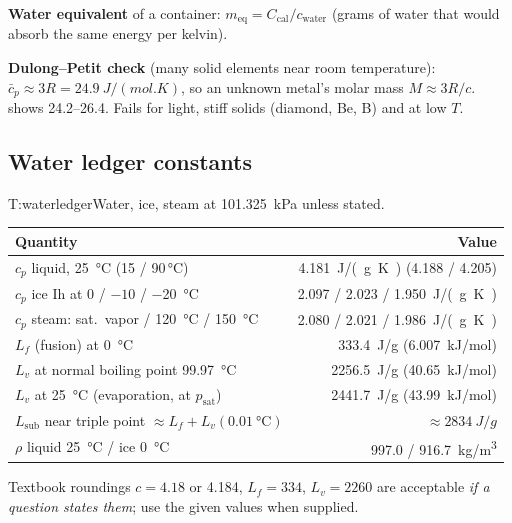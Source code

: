 \begin{multicols}{2}
\textbf{Water equivalent} of a container: $m_{\text{eq}}=C_{\text{cal}}/c_{\text{water}}$ (grams of water that would absorb the same energy per kelvin).

\textbf{Dulong--Petit check} (many solid elements near room temperature): $\bar c_p\approx 3R=\SI{24.9}{J/(mol.K)}$, so an unknown metal's molar mass $M\approx 3R/c$.  shows 24.2--26.4. Fails for light, stiff solids (diamond, Be, B) and at low $T$.

\subsection{Water ledger constants}\label{sec:waterconst}
\begin{reftab}{T:waterledger}{Water, ice, steam at \SI{101.325}{kPa} unless stated.}
\small
\begin{tabularx}{\linewidth}{@{}Yr@{}}
\toprule
Quantity & Value\\
\midrule
$c_p$ liquid, \SI{25}{\celsius} (15 / 90\,\si{\celsius}) & \SI{4.181}{J/(g.K)} (4.188 / 4.205)\\
$c_p$ ice Ih at 0 / $-10$ / \SI{-20}{\celsius} & 2.097 / 2.023 / \SI{1.950}{J/(g.K)}\\
$c_p$ steam: sat.\ vapor / \SI{120}{\celsius} / \SI{150}{\celsius} & 2.080 / 2.021 / \SI{1.986}{J/(g.K)}\\
$L_f$ (fusion) at \SI{0}{\celsius} & \SI{333.4}{J/g} (\SI{6.007}{kJ/mol})\\
$L_v$ at normal boiling point \SI{99.97}{\celsius} & \SI{2256.5}{J/g} (\SI{40.65}{kJ/mol})\\
$L_v$ at \SI{25}{\celsius} (evaporation, at $p_{\text{sat}}$) & \SI{2441.7}{J/g} (\SI{43.99}{kJ/mol})\\
$L_{\text{sub}}$ near triple point $\approx L_f+L_v(\SI{0.01}{\celsius})$ & $\approx\SI{2834}{J/g}$\\
$\rho$ liquid \SI{25}{\celsius} / ice \SI{0}{\celsius} & 997.0 / \SI{916.7}{kg/m^3}\\
\bottomrule
\end{tabularx}\end{reftab}
Textbook roundings $c=4.18$ or 4.184, $L_f=334$, $L_v=2260$ are acceptable \emph{if a question states them}; use the given values when supplied.


\end{multicols}
